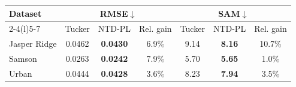 \begin{tabular}{@{}lcccccc@{}}
\toprule
\multirow{2}{*}{Dataset} &
\multicolumn{3}{c}{RMSE$\downarrow$} &
\multicolumn{3}{c}{SAM$\downarrow$} \\
\cmidrule(lr){2-4}\cmidrule(l){5-7}
& Tucker & NTD-PL & Rel. gain & Tucker & NTD-PL & Rel. gain \\
\midrule
Jasper Ridge & 0.0462 & \textbf{0.0430} & 6.9\% &
9.14 & \textbf{8.16} & 10.7\% \\
Samson & 0.0263 & \textbf{0.0242} & 7.9\% &
5.70 & \textbf{5.65} & 1.0\% \\
Urban & 0.0444 & \textbf{0.0428} & 3.6\% &
8.23 & \textbf{7.94} & 3.5\% \\
\bottomrule
\end{tabular}
